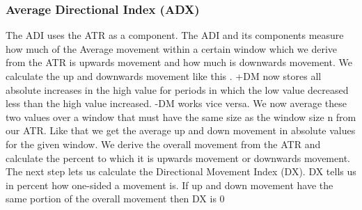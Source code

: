 \documentclass[a4paper,12pt]{report}
\begin{document}
			
			
			
			\subsubsection{Average Directional Index (ADX)}
			The ADI uses the ATR as a component. The ADI and its components measure how much of the Average movement within a certain window which we derive from the ATR is upwards movement and how much is downwards movement. We calculate the up and downwards movement like this \cite{32}. +DM now stores all absolute increases in the high value for periods in which the low value decreased less than the high value increased. -DM works vice versa. We now average these two values over a window that must have the same size as the window size n from our ATR. Like that we get the average up and down movement in absolute values for the given window. We derive the overall movement from the ATR and calculate the percent to which it is upwards movement or downwards movement. The next step lets us calculate the Directional Movement Index (DX). DX tells us in percent how one-sided a movement is. If up and down movement have the same portion of the overall movement then DX is 0%
			
\end{document}
